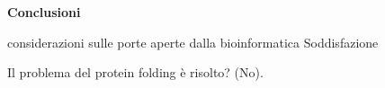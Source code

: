 
\textbf{{\LARGE Conclusioni}}
\vspace{1cm}

considerazioni sulle porte aperte dalla bioinformatica
Soddisfazione

Il problema del protein folding è risolto? (No).